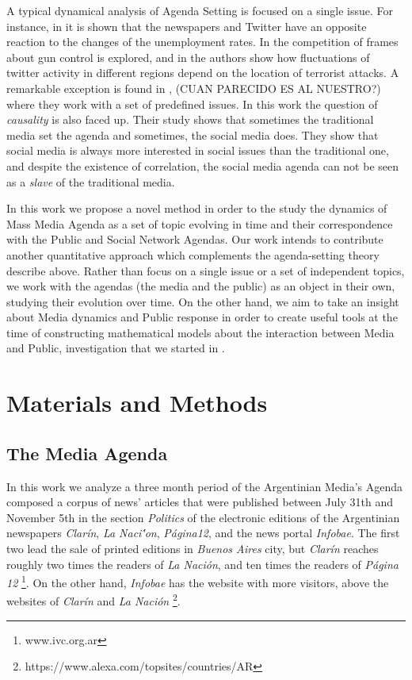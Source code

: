 \documentclass[a4paper, 12pt]{article}
\begin{document}
\par A typical  dynamical analysis of Agenda Setting is focused on a single issue. For instance, in \cite{soroka2017negativity} it is shown that the newspapers and Twitter have an opposite reaction to the changes of the unemployment rates. In \cite{guggenheim2015dynamics} the competition of frames about gun control is explored, and in \cite{ali2018measuring} the authors show how fluctuations of  twitter activity in different regions depend on the location of terrorist attacks.
A remarkable exception is found in  \cite{russell2014dynamics},  (CUAN PARECIDO ES AL NUESTRO?) where they work with a set of predefined issues. In this work the question of \emph{causality} is also faced up. Their study shows that sometimes the traditional media set the agenda and sometimes, the social media does. They show that social media is always more interested in social issues than the traditional one, and despite the existence of correlation, the social media agenda can not be seen as a \emph{slave} of the traditional media.

\par In this work we propose a novel method in order to the study the dynamics of Mass Media Agenda as a set of topic evolving in time and their correspondence with the Public and Social Network Agendas.  Our work intends to contribute another quantitative approach which complements the agenda-setting theory describe above.
Rather than focus on a single issue or a set of independent topics, we work with the agendas (the media and the public) as an object in their own, studying their evolution over time. On the other hand, we aim to take an insight about Media dynamics and Public response in order to create useful tools at the time of constructing mathematical models about the interaction between Media and Public, investigation that we started in \cite{pinto2016setting}.


%
\section{Materials and Methods} \label{sec:MatMeth}

\subsection{The Media Agenda}

In this work we analyze a three month period of the Argentinian Media's Agenda composed a corpus of news' articles that were published between July 31th and November 5th in the section \emph{Politics} of the electronic editions of the Argentinian newspapers \emph{Clar\'in}, \emph{La Naci\''on}, \emph{P\'agina12}, and the news portal \emph{Infobae}. The first two lead the sale of printed editions in \emph{Buenos Aires} city, but \emph{Clar\'in} reaches roughly two times the readers of \emph{La Naci\'on}, and ten times the readers of \emph{P\'agina 12} \footnote{www.ivc.org.ar}. On the other hand, \emph{Infobae} has the website with more visitors, above the websites of \emph{Clar\'in} and \emph{La Naci\'on} \footnote{https://www.alexa.com/topsites/countries/AR}.
\end{document}
